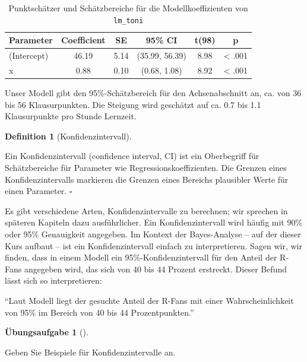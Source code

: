 \documentclass[
  ngerman,
  letterpaper,
  twoside,
  open=any]{scrbook}
\theoremstyle{definition}
\theoremstyle{plain}
\theoremstyle{definition}
\newtheorem{exercise}{Übungsaufgabe}[chapter]
\theoremstyle{definition}
\newtheorem{definition}{Definition}[chapter]
\theoremstyle{remark}
\begin{document}
{

\begin{longtable}[]{@{}lccccc@{}}

\caption{\label{tbl-toni-params}Punktschätzer und Schätzbereiche für die
Modellkoeffizienten von \texttt{lm\_toni}}

\tabularnewline

\toprule\noalign{}
Parameter & Coefficient & SE & 95\% CI & t(98) & p \\
\midrule\noalign{}
\endhead
\bottomrule\noalign{}
\endlastfoot
(Intercept) & 46.19 & 5.14 & (35.99, 56.39) & 8.98 & \textless{} .001 \\
x & 0.88 & 0.10 & (0.68, 1.08) & 8.92 & \textless{} .001 \\

\end{longtable}

}

Unser Modell gibt den 95\%-Schätzbereich für den Achsenabschnitt an, ca.
von 36 bis 56 Klausurpunkten. Die Steigung wird geschätzt auf ca. 0.7
bis 1.1 Klausurpunkte pro Stunde Lernzeit.

\begin{definition}[Konfidenzintervall]\protect\hypertarget{def-konfintervall}{}\label{def-konfintervall}

Ein Konfidenzintervall (confidence interval, CI) ist ein Oberbegriff für
Schätzbereiche für Parameter wie Regressionskoeffizienten. Die Grenzen
eines Konfidenzintervalls markieren die Grenzen eines Bereichs
plausibler Werte für einen Parameter. \(\square\)

\end{definition}

Es gibt verschiedene Arten, Konfidenzintervalle zu berechnen; wir
sprechen in späteren Kapiteln dazu ausführlicher. Ein Konfidenzintervall
wird häufig mit 90\% oder 95\% Genauigkeit angegeben. Im Kontext der
Bayes-Analyse -- auf der dieser Kurs aufbaut -- ist ein
Konfidenzintervall einfach zu interpretieren. Sagen wir, wir finden,
dass in einem Modell ein 95\%-Konfidenzintervall für den Anteil der
R-Fans angegeben wird, das sich von 40 bis 44 Prozent erstreckt. Dieser
Befund lässt sich so interpretieren:

\begin{displayquote}
``Laut Modell liegt der gesuchte Anteil der R-Fans mit einer
Wahrscheinlichkeit von 95\% im Bereich von 40 bis 44 Prozentpunkten.''
\end{displayquote}

\begin{exercise}[]\protect\hypertarget{exr-ungewisskorr}{}\label{exr-ungewisskorr}

Geben Sie Beispiele für Konfidenzintervalle an.

\end{exercise}
\end{document}
